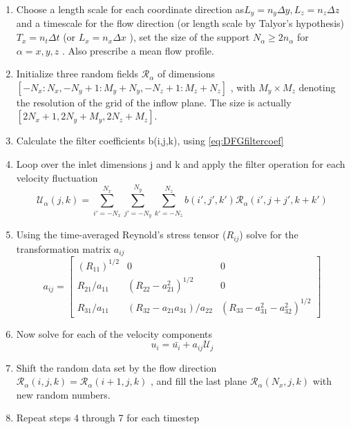\begin{enumerate}
\item Choose a length scale for each coordinate direction as$ L_{y}=n_{y}\Delta y , L_{z}=n_{z}\Delta z $ and a timescale for the flow direction (or length scale by Talyor's hypothesis) $T_{x}=n_{t}\Delta t$  (or $L_{x} = n_x \Delta x$ ), set the size of the support $N_{\alpha}\geq 2n_{\alpha} $ for $\alpha=x,y,z$ . Also prescribe a mean flow profile.
\item Initialize three random fields $\mathcal{R}_{\alpha}$  of dimensions $[-N_{x}:N_{x},-N_{y}+1:M_{y}+N_{y},-N_{z}+1:M_{z}+N_{z} ]$ , with $M_{y}\times M_{z}$  denoting the resolution of the grid of the inflow plane. The size is actually $[2N_{x}+1,2N_{y}+M_{y},2N_{z}+M_{z} ]$.
\item Calculate the filter coefficients b(i,j,k), using \ref{eq:DFGfiltercoef}
\item Loop over the inlet dimensions j  and k  and apply the filter operation for each velocity fluctuation
\begin{equation} \label{eq:DFGmain}
\mathcal{U}_{\alpha}(j,k)=\sum_{i'=-N_{x}}^{N_{x}}\sum_{j'=-N_{y}}^{N_{y}}\sum_{k'=-N_{z}}^{N_{z}}b(i',j',k')\mathcal{R}_{\alpha}(i',j+j',k+k') 
\end{equation}
\item Using the time-averaged Reynold's stress tensor ($R_{ij}$)  solve for the transformation matrix $a_{ij}$
\begin{equation}
 a_{ij}=\left[\begin{array}{ccc}
(R_{11})^{1/2} & 0 & 0\\
R_{21}/a_{11} & (R_{22}-a_{21}^{2})^{1/2} & 0\\
R_{31}/a_{11} & (R_{32}-a_{21}a_{31})/a_{22} & (R_{33}-a_{31}^{2}-a_{32}^{2})^{1/2}
\end{array}\right] 
\end{equation}
\item  Now solve for each of the velocity components
\begin{equation}
u_{i}=\bar{u_{i}}+a_{ij}\mathcal{U}_{j} 
\end{equation}
\item Shift the random data set by the flow direction $\mathcal{R}_{\alpha}(i,j,k)=\mathcal{R}_{\alpha}(i+1,j,k)$ , and fill the last plane $\mathcal{R}_{\alpha}(N_{x},j,k)$  with new random numbers.
\item Repeat steps 4 through 7 for each timestep
\end{enumerate}

